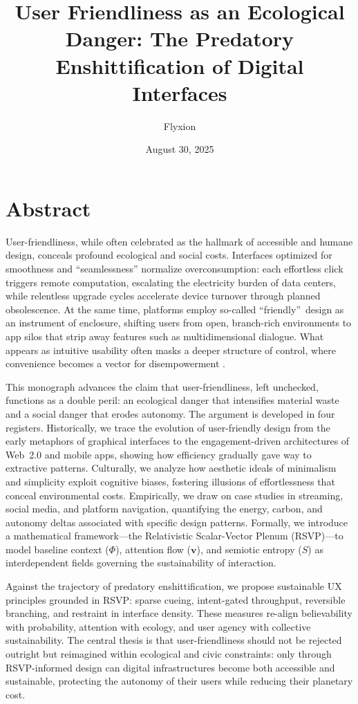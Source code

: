 \documentclass[openany]{book}
\title{User Friendliness as an Ecological Danger: The Predatory Enshittification of Digital Interfaces}
\author{Flyxion}
\date{August 30, 2025}
\begin{document}
\maketitle
{}

\chapter*{Abstract}
User-friendliness, while often celebrated as the hallmark of accessible and humane design, conceals profound ecological and social costs. Interfaces optimized for smoothness and “seamlessness” normalize overconsumption: each effortless click triggers remote computation, escalating the electricity burden of data centers, while relentless upgrade cycles accelerate device turnover through planned obsolescence. At the same time, platforms employ so-called \textquotedblleft friendly\textquotedblright\ design as an instrument of enclosure, shifting users from open, branch-rich environments to app silos that strip away features such as multidimensional dialogue. What appears as intuitive usability often masks a deeper structure of control, where convenience becomes a vector for disempowerment \citep{doctorow2022}.

This monograph advances the claim that user-friendliness, left unchecked, functions as a double peril: an ecological danger that intensifies material waste and a social danger that erodes autonomy. The argument is developed in four registers. Historically, we trace the evolution of user-friendly design from the early metaphors of graphical interfaces to the engagement-driven architectures of Web~2.0 and mobile apps, showing how efficiency gradually gave way to extractive patterns. Culturally, we analyze how aesthetic ideals of minimalism and simplicity exploit cognitive biases, fostering illusions of effortlessness that conceal environmental costs. Empirically, we draw on case studies in streaming, social media, and platform navigation, quantifying the energy, carbon, and autonomy deltas associated with specific design patterns. Formally, we introduce a mathematical framework---the Relativistic Scalar-Vector Plenum (RSVP)---to model baseline context ($\Phi$), attention flow ($\mathbf{v}$), and semiotic entropy ($S$) as interdependent fields governing the sustainability of interaction.

Against the trajectory of predatory enshittification, we propose sustainable UX principles grounded in RSVP: sparse cueing, intent-gated throughput, reversible branching, and restraint in interface density. These measures re-align believability with probability, attention with ecology, and user agency with collective sustainability. The central thesis is that user-friendliness should not be rejected outright but reimagined within ecological and civic constraints: only through RSVP-informed design can digital infrastructures become both accessible and sustainable, protecting the autonomy of their users while reducing their planetary cost.
\end{document}
